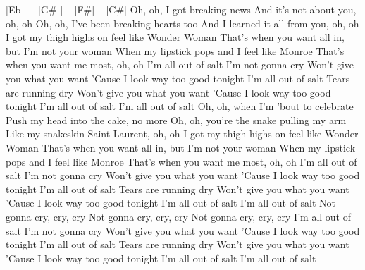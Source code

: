 [Eb-] ~ [G#-] ~ [F#] ~ [C#]
Oh, oh, I got breaking news
And it's not about you, oh, oh
Oh, oh, I've been breaking hearts too
And I learned it all from you, oh, oh
I got my thigh highs on feel like Wonder Woman
That's when you want all in, but I'm not your woman
When my lipstick pops and I feel like Monroe
That's when you want me most, oh, oh
I'm all out of salt
I'm not gonna cry
Won't give you what you want
'Cause I look way too good tonight
I'm all out of salt
Tears are running dry
Won't give you what you want
'Cause I look way too good tonight
I'm all out of salt
I'm all out of salt
Oh, oh, when I'm 'bout to celebrate
Push my head into the cake, no more
Oh, oh, you're the snake pulling my arm
Like my snakeskin Saint Laurent, oh, oh
I got my thigh highs on feel like Wonder Woman
That's when you want all in, but I'm not your woman
When my lipstick pops and I feel like Monroe
That's when you want me most, oh, oh
I'm all out of salt
I'm not gonna cry
Won't give you what you want
'Cause I look way too good tonight
I'm all out of salt
Tears are running dry
Won't give you what you want
'Cause I look way too good tonight
I'm all out of salt
I'm all out of salt
Not gonna cry, cry, cry
Not gonna cry, cry, cry
Not gonna cry, cry, cry
I'm all out of salt
I'm not gonna cry
Won't give you what you want
'Cause I look way too good tonight
I'm all out of salt
Tears are running dry
Won't give you what you want
'Cause I look way too good tonight
I'm all out of salt
I'm all out of salt